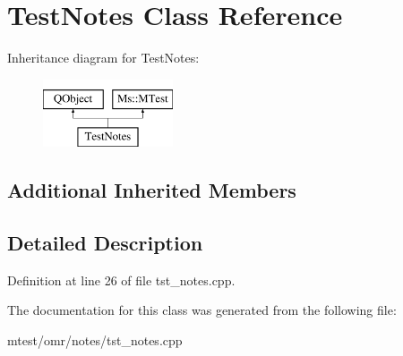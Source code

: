 \hypertarget{class_test_notes}{}\section{Test\+Notes Class Reference}
\label{class_test_notes}
Inheritance diagram for Test\+Notes\+:\begin{figure}[H]
\begin{center}
\leavevmode
\includegraphics[height=2.000000cm]{class_test_notes}
\end{center}
\end{figure}
\subsection*{Additional Inherited Members}


\subsection{Detailed Description}


Definition at line 26 of file tst\+\_\+notes.\+cpp.



The documentation for this class was generated from the following file\+:\begin{DoxyCompactItemize}
\item 
mtest/omr/notes/tst\+\_\+notes.\+cpp\end{DoxyCompactItemize}
